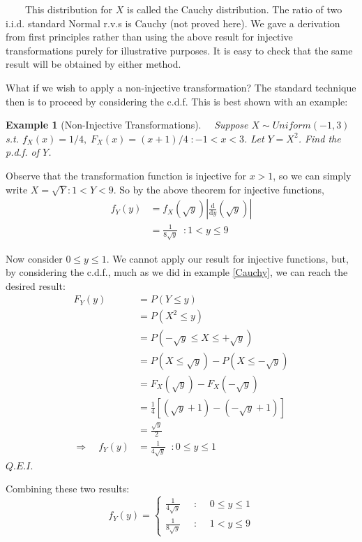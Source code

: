 \documentclass[12pt,a4paper]{article}
\newtheorem{ex}[thm]{Example}
\begin{document}
$\qquad$This distribution for $X$ is called the Cauchy distribution. The ratio of two i.i.d. standard Normal r.v.s is Cauchy (not proved here). We gave a derivation from first principles rather than using the above result for injective transformations purely for illustrative purposes. It is easy to check that the same result will be obtained by either method.

What if we wish to apply a non-injective transformation? The standard technique then is to proceed by considering the c.d.f. This is best shown with an example:

\begin{ex}[Non-Injective Transformations]

$\quad$Suppose $X \sim Uniform(-1, 3)$ s.t. $f_X(x) = 1/4, \; F_X(x) = (x + 1)/4 \; : -1 < x < 3$. Let $Y = X^2$. Find the p.d.f. of $Y$.
\end{ex}

Observe that the transformation function is injective for $x > 1$, so we can simply write $X = \sqrt Y : 1 < Y < 9$. So by the above theorem for injective functions,
\begin{align*}
f_Y(y) &= f_X(\sqrt y) \left| \frac{\mathrm{d}}{\mathrm{d}y}(\sqrt y) \right|\\
&= \frac{1}{8 \sqrt y} \;\; : 1 < y \leq 9
\end{align*}

Now consider $0 \leq y \leq 1$. We cannot apply our result for injective functions, but, by considering the c.d.f., much as we did in example \ref{Cauchy}, we can reach the desired result:
\begin{align*}
F_Y(y) &= P(Y \leq y)\\
&= P(X^2 \leq y)\\
&= P(-\sqrt y \leq X \leq +\sqrt y)\\
&= P(X \leq \sqrt y) - P(X \leq -\sqrt y)\\
&= F_X(\sqrt y) - F_X(- \sqrt y)\\
&= \frac{1}{4}[(\sqrt y + 1) - (-\sqrt y + 1)]\\
&= \frac{\sqrt y}{2}\\
\Rightarrow\quad f_Y(y) &= \frac{1}{4 \sqrt y} \; \; : 0 \leq y \leq 1
\end{align*}\hfill $Q.E.I.$

\noindent Combining these two results:
$$f_Y(y) = \left\{ \begin{array}{ccl} \frac{1}{4 \sqrt y} \;\; &: \;\; &0 \leq y \leq 1\\ \frac{1}{8 \sqrt y} \;\; &: \;\; &1 < y \leq 9 \end{array}\right.$$
\end{document}
